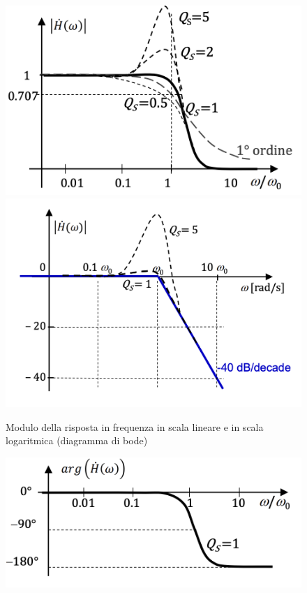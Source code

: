 \documentclass{article}
\theoremstyle{definition}
\begin{document}
\begin{itemize}
\begin{figure}[h]
	\centering 
	\includegraphics[scale=0.35]{immagini/pbRLCg}
	\hfil 
	\includegraphics[scale=0.35]{immagini/pbRLCbode}
	\caption{Modulo della risposta in frequenza in scala lineare e in scala logaritmica (diagramma di bode)}
\end{figure}
\begin{figure}[h]
	\centering 
	\includegraphics[scale=0.50]{immagini/pbRLCg1}

\end{figure}
\end{itemize}
\end{document}
